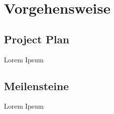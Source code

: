 \section{Vorgehensweise}

\subsection*{Project Plan}

Lorem Ipsum

\subsection*{Meilensteine}

Lorem Ipsum

\clearpage
